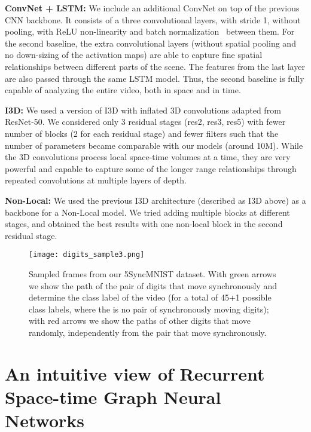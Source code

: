 \documentclass{article}
\begin{document}
\textbf{ConvNet + LSTM:} We include an additional ConvNet on top of the previous CNN backbone. It consists of a three convolutional layers, with stride 1, without pooling, with ReLU non-linearity and batch normalization~\cite{pmlr-v37-ioffe15} between them. For the second baseline, the extra convolutional layers (without spatial pooling and no down-sizing of the activation maps) are able to capture fine spatial relationships between different parts of the scene. The features from the last layer are also passed through the same LSTM model. Thus, the second baseline is fully capable of analyzing the entire video, both in space and in time.

\textbf{I3D:}  We used a version of I3D \cite{carreira2017quo} with inflated 3D convolutions adapted from ResNet-50. We considered only 3 residual stages (res2, res3, res5) with fewer number of blocks (2 for each residual stage) and fewer filters such that the number of parameters became comparable with our models (around 10M). While the 3D convolutions process local space-time volumes at a time, they are very powerful and capable to capture some of the longer range relationships through repeated convolutions at multiple layers of depth.

\textbf{Non-Local:}  We used the previous I3D architecture (described as I3D above) as a backbone for a Non-Local\cite{wang2018non_local} model. We tried adding multiple blocks at different stages, and obtained the best results with one non-local block in the second residual stage.

\begin{figure}[t!]
\begin{center}
\centerline{\texttt{[image: digits\_sample3.png]}}
\caption{Sampled frames from our 5SyncMNIST dataset. With green arrows we show the path of the pair of digits that move synchronously and determine the class label of the video (for a total of 45+1 possible class labels, where the is no pair of synchronously moving digits); with red arrows we show the paths of other digits that move randomly, independently from the pair that move synchronously.}
\label{fig:main_graph_figure}
\end{center}
\end{figure}








\section{An intuitive view of Recurrent Space-time Graph Neural Networks}
\end{document}
